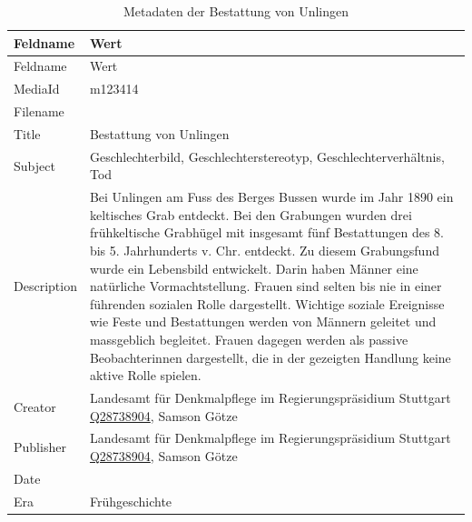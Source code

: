 \documentclass[
  letterpaper,
  DIV=11,
  numbers=noendperiod]{scrartcl}
\begin{document}
\begin{longtable}[]{@{}
  >{\raggedright\arraybackslash}p{}
  >{\raggedright\arraybackslash}p{}@{}}
\caption{Metadaten der Bestattung von
Unlingen}\label{tbl-metadaten-bestattung-von-unlingen}\tabularnewline
\toprule\noalign{}
\begin{minipage}[b]{\linewidth}\raggedright
Feldname
\end{minipage} & \begin{minipage}[b]{\linewidth}\raggedright
Wert
\end{minipage} \\
\midrule\noalign{}
\endfirsthead
\toprule\noalign{}
\begin{minipage}[b]{\linewidth}\raggedright
Feldname
\end{minipage} & \begin{minipage}[b]{\linewidth}\raggedright
Wert
\end{minipage} \\
\midrule\noalign{}
\endhead
\bottomrule\noalign{}
\endlastfoot
MediaId & m123414 \\
Filename & \\
Title & Bestattung von Unlingen \\
Subject & Geschlechterbild, Geschlechterstereotyp,
Geschlechterverhältnis, Tod \\
Description & Bei Unlingen am Fuss des Berges Bussen wurde im Jahr 1890
ein keltisches Grab entdeckt. Bei den Grabungen wurden drei
frühkeltische Grabhügel mit insgesamt fünf Bestattungen des 8. bis 5.
Jahrhunderts v. Chr. entdeckt. Zu diesem Grabungsfund wurde ein
Lebensbild entwickelt. Darin haben Männer eine natürliche
Vormachtstellung. Frauen sind selten bis nie in einer führenden sozialen
Rolle dargestellt. Wichtige soziale Ereignisse wie Feste und
Bestattungen werden von Männern geleitet und massgeblich begleitet.
Frauen dagegen werden als passive Beobachterinnen dargestellt, die in
der gezeigten Handlung keine aktive Rolle spielen. \\
Creator & Landesamt für Denkmalpflege im Regierungspräsidium Stuttgart
\href{https://www.wikidata.org/wiki/Q28738904}{Q28738904}, Samson
Götze \\
Publisher & Landesamt für Denkmalpflege im Regierungspräsidium Stuttgart
\href{https://www.wikidata.org/wiki/Q28738904}{Q28738904}, Samson
Götze \\
Date & \\
Era & Frühgeschichte \\

\end{longtable}
\end{document}
